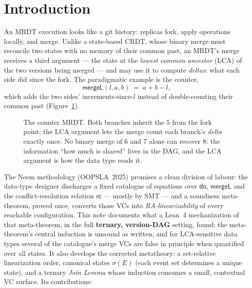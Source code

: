 \documentclass[11pt]{article}
\newcommand{\mergeL}{\mathsf{mergeL}}
\begin{document}
\tableofcontents

\section{Introduction}

An MRDT execution looks like a git history: replicas fork, apply
operations locally, and merge. Unlike a state-based CRDT, whose binary
merge must reconcile two states with no memory of their common past, an
MRDT's merge receives a third argument --- the state at the \emph{lowest
common ancestor} (LCA) of the two versions being merged --- and may use it
to compute \emph{deltas}: what each side did since the fork. The
paradigmatic example is the counter,
\[
  \mergeL(l,a,b) \;=\; a + b - l,
\]
which adds the two sides' increments-since-$l$ instead of double-counting
their common past (Figure~\ref{fig:counter}).

\begin{figure}[t]
\centering
{}
\caption{The counter MRDT. Both branches inherit the $5$ from the fork
point; the LCA argument lets the merge count each branch's \emph{delta}
exactly once. No binary merge of $6$ and $7$ alone can recover $8$: the
information ``how much is shared'' lives in the DAG, and the LCA argument
is how the data type reads it.}
\label{fig:counter}
\end{figure}

The Neem methodology (OOPSLA~2025) promises a clean division of labour:
the data-type designer discharges a fixed catalogue of equations over
$\mathsf{do}$, $\mergeL$ and the conflict-resolution relation
$\mathsf{rc}$ --- mostly by SMT --- and a soundness meta-theorem, proved
once, converts those VCs into \emph{RA-linearizability} of every reachable
configuration. This note documents what a Lean~4 mechanization of that
meta-theorem, in the full \textbf{ternary, version-DAG} setting, found:
the meta-theorem's central induction is unsound as written, and for
LCA-sensitive data types several of the catalogue's merge VCs are false
in principle when quantified over all states. It also develops the
corrected metatheory: a set-relative linearization order, canonical
states $\sigma(E)$ (each event set determines a unique state), and a
ternary \emph{Join Lemma} whose induction
consumes a small, contextual VC surface. Its contributions:
\end{document}
